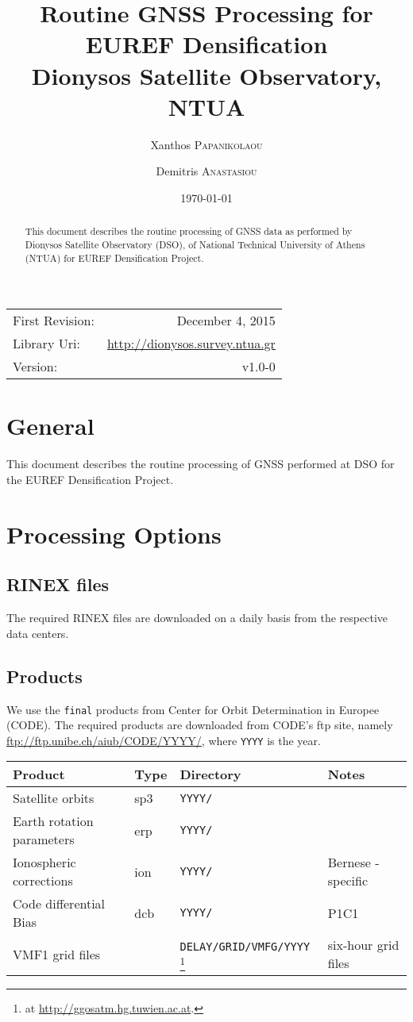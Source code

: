 \documentclass{article}
\title{Routine GNSS Processing for EUREF Densification\\ Dionysos Satellite Observatory, NTUA} %
\author{Xanthos \textsc{Papanikolaou} \and Demitris \textsc{Anastasiou}}
\date{\today} %
\begin{document}
\maketitle %

\begin{center}
\begin{tabular}{l r}
First Revision: & December 4, 2015 \\
Library Uri:    & \url{http://dionysos.survey.ntua.gr} \\
Version:        & v1.0-0
\end{tabular}
\end{center}

\begin{abstract}
{\small 
This document describes the routine processing of GNSS data as performed 
by Dionysos Satellite Observatory (DSO), of National Technical University of 
Athens (NTUA) for EUREF Densification Project.
}
\end{abstract}
\clearpage

\tableofcontents
\clearpage

\section{General}
This document describes the routine processing of GNSS performed at DSO for
the EUREF Densification Project.
\clearpage

\section{Processing Options}
\subsection{RINEX files}
The required RINEX files are downloaded on a daily basis from the respective
data centers.
\subsection{Products}
We use the \texttt{final} products from Center for Orbit Determination in Europee
(CODE). The required products are downloaded from CODE's ftp site, namely
\url{ftp://ftp.unibe.ch/aiub/CODE/YYYY/}, where \texttt{YYYY} is the year.
\begin{center}
\begin{tabular}{l l l l}
Product & Type & Directory & Notes\\
\hline
Satellite orbits & sp3 & \texttt{YYYY/} & \\
Earth rotation parameters & erp & \texttt{YYYY/} & \\
Ionospheric corrections & ion & \texttt{YYYY/} & Bernese - specific\\
Code differential Bias & dcb & \texttt{YYYY/} & P1C1\\
VMF1 grid files & & \texttt{DELAY/GRID/VMFG/YYYY} \footnote{at \url{http://ggosatm.hg.tuwien.ac.at}.} & six-hour grid files\\
\hline
\end{tabular}
\end{center}
\end{document}
